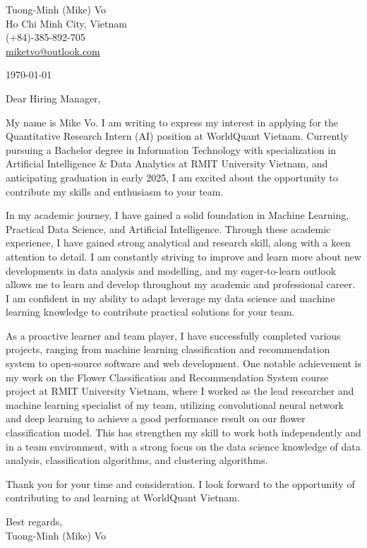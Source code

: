 \documentclass[a4paper,11pt]{article}
\makeatletter
\newcommand{\header}{
  \small{
    Tuong-Minh (Mike) Vo\\
    Ho Chi Minh City, Vietnam\\
    (+84)-385-892-705\\
    \href{mailto:miketvo@outlook.com}{miketvo@outlook.com}
  }
  \par\noindent\hrulefill
}
\newcommand{\p}[1]{#1\\\vspace{6pt}}
\makeatother
\begin{document}
\header

\p{\today}

\p{Dear Hiring Manager,}

\p{My name is Mike Vo. I am writing to express my interest in applying for the Quantitative Research Intern (AI) position at WorldQuant Vietnam. Currently pursuing a Bachelor degree in Information Technology with specialization in Artificial Intelligence \& Data Analytics at RMIT University Vietnam, and anticipating graduation in early 2025, I am excited about the opportunity to contribute my skills and enthusiasm to your team.}

\p{In my academic journey, I have gained a solid foundation in Machine Learning, Practical Data Science, and Artificial Intelligence. Through these academic experience, I have gained strong analytical and research skill, along with a keen attention to detail. I am constantly striving to improve and learn more about new developments in data analysis and modelling, and my eager-to-learn outlook allows me to learn and develop throughout my academic and professional career. I am confident in my ability to adapt leverage my data science and machine learning knowledge to contribute practical solutions for your team.}

\p{As a proactive learner and team player, I have successfully completed various projects, ranging from machine learning classification and recommendation system to open-source software and web development. One notable achievement is my work on the Flower Classification and Recommendation System course project at RMIT University Vietnam, where I worked as the lead researcher and machine learning specialist of my team, utilizing convolutional neural network and deep learning to achieve a good performance result on our flower classification model. This has strengthen my skill to work both independently and in a team environment, with a strong focus on the data science knowledge of data analysis, classification algorithms, and clustering algorithms.}

\p{Thank you for your time and consideration. I look forward to the opportunity of contributing to and learning at WorldQuant Vietnam.}

\p{Best regards,\\
Tuong-Minh (Mike) Vo}
\end{document}
